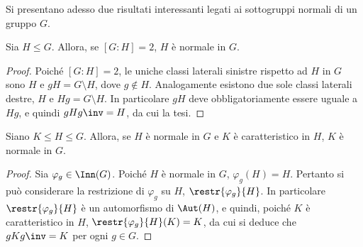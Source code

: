 \documentclass[12pt]{scrartcl}
\begin{document}
	
	Si presentano adesso due risultati interessanti legati ai sottogruppi normali di
	un gruppo $G$.
	
	\begin{proposition}
		Sia $H \leq G$. Allora, se $[G : H] = 2$, $H$ è normale in $G$.
	\end{proposition}
	
	\begin{proof}
		Poiché $[G : H] = 2$, le uniche classi laterali sinistre rispetto ad $H$ in
		$G$ sono $H$ e $gH = G \setminus H$, dove $g \notin H$. Analogamente esistono
		due sole classi laterali destre, $H$ e $Hg = G \setminus H$. In particolare
		$gH$ deve obbligatoriamente essere uguale a $Hg$, e quindi $gHg\inv = H$, da
		cui la tesi.
	\end{proof}
	
	\begin{proposition}
		Siano $K \leq H \leq G$. Allora, se $H$ è normale in $G$ e $K$ è caratteristico
		in $H$, $K$ è normale in $G$.
	\end{proposition}
	
	\begin{proof}
		Sia $\varphi_g \in \Inn(G)$. Poiché $H$ è normale in $G$, $\varphi_g(H) = H$. Pertanto
		si può considerare la restrizione di $\varphi_g$ su $H$, $\restr{\varphi_g}{H}$.
		In particolare $\restr{\varphi_g}{H}$ è un automorfismo di $\Aut(H)$, e quindi,
		poiché $K$ è caratteristico in $H$, $\restr{\varphi_g}{H}(K) = K$, da cui si
		deduce che $gKg\inv = K$ per ogni $g \in G$.
	\end{proof}
\end{document}
